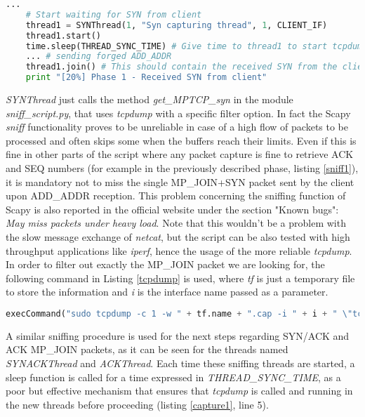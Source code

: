 \begin{lstlisting}[language=python, caption=\textit{Multiple threads are used to capture the answer from the UMLs}, label=capture1]
    ...
    # Start waiting for SYN from client
    thread1 = SYNThread(1, "Syn capturing thread", 1, CLIENT_IF)
    thread1.start()
    time.sleep(THREAD_SYNC_TIME) # Give time to thread1 to start tcpdumping
    ... # sending forged ADD_ADDR
    thread1.join() # This should contain the received SYN from the client
    print "[20%] Phase 1 - Received SYN from client"
\end{lstlisting}

\textit{SYNThread} just calls the method \textit{get\_MPTCP\_syn} in the module \textit{sniff\_script.py}, that uses \textit{tcpdump} with a specific filter option. In fact the Scapy \textit{sniff} functionality proves to be unreliable in case of a high flow of packets to be processed and often skips some when the buffers reach their limits. Even if this is fine in other parts of the script where any packet capture is fine to retrieve ACK and SEQ numbers (for example in the previously described phase, listing \ref{sniff1}), it is mandatory not to miss the single MP\_JOIN+SYN packet sent by the client upon ADD\_ADDR reception. This problem concerning the sniffing function of Scapy is also reported in the official website under the section "Known bugs": \textit{May miss packets under heavy load}.
Note that this wouldn't be a problem with the slow message exchange of \textit{netcat}, but the script can be also tested with high throughput applications like \textit{iperf}, hence the usage of the more reliable \textit{tcpdump}.
In order to filter out exactly the MP\_JOIN packet we are looking for, the following command in Listing \ref{tcpdump} is used, where \textit{tf} is just a temporary file to store the information and \textit{i} is the interface name passed as a parameter.

\begin{lstlisting}[language=python, caption=\textit{tcpdump for MP\_JOIN}, label=tcpdump]
execCommand("sudo tcpdump -c 1 -w " + tf.name + ".cap -i " + i + " \"tcp[tcpflags] & tcp-syn != 0\" 2>/dev/null", shell = True)
\end{lstlisting}

A similar sniffing procedure is used for the next steps regarding SYN/ACK and ACK MP\_JOIN packets, as it can be seen for the threads named \textit{SYNACKThread} and \textit{ACKThread}. Each time these sniffing threads are started, a sleep function is called for a time expressed in \textit{THREAD\_SYNC\_TIME}, as a poor but effective mechanism that ensures that \textit{tcpdump} is called and running in the new threads before proceeding (listing \ref{capture1}, line 5).

